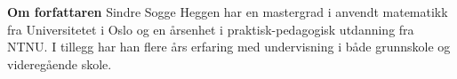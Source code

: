 


\newpage
\pagecolor{Aquamarine!30}
\thispagestyle{empty}
\textbf{Om forfattaren} \os
Sindre Sogge Heggen har en mastergrad i anvendt matematikk fra Universitetet i Oslo og en årsenhet i praktisk-pedagogisk utdanning fra NTNU. I tillegg har han flere års erfaring med undervisning i både grunnskole og videregående skole.
